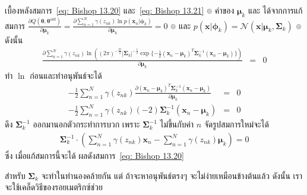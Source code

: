 เบื้องหลังสมการ~\ref{eq: Bishop 13.20} และ~\ref{eq: Bishop 13.21}
๏ ค่าของ $\bm{\mu}_k$ และ ได้จากการแก้สมการ $\frac{\partial Q(\bm{\theta}, \bm{\theta}^{old})}{\partial \bm{\mu}_k} = \frac{\partial \sum_{n=1}^N \gamma (z_{nk}) \ln p(\textbf{x}_n|\bm{\phi}_k)}{\partial \bm{\mu}_k} = 0$ 
๏ และ $p(\textbf{x}|\bm{\phi}_k) = \mathcal{N}(\textbf{x}|\bm{\mu}_k, \bm{\Sigma}_k)$
๏ ดังนั้น
\begin{eqnarray}
\frac{\partial \sum_{n=1}^N \gamma (z_{nk}) \ln \left( (2 \pi)^{-\frac{D}{2}} | \bm{\Sigma}_k |^{-\frac{1}{2}} \exp\{ -\frac{1}{2} (\textbf{x}_n - \bm{\mu}_k)^T \bm{\Sigma}_k^{-1} (\textbf{x}_n - \bm{\mu}_k) \}\right)}{\partial \bm{\mu}_k} &=& 0
\nonumber
\end{eqnarray}
ทำ $\ln$ ก่อนและทำอนุพันธ์จะได้
\begin{eqnarray}
-\frac{1}{2} \sum_{n=1}^N \gamma (z_{nk})  \frac{\partial (\textbf{x}_n - \bm{\mu}_k)^T \bm{\Sigma}_k^{-1} (\textbf{x}_n - \bm{\mu}_k)}{\partial \bm{\mu}_k}
&=& 0
\nonumber \\
-\frac{1}{2} \sum_{n=1}^N \gamma (z_{nk})  (-2) \bm{\Sigma}_k^{-1} (\textbf{x}_n - \bm{\mu}_k)
&=& 0
\nonumber
\end{eqnarray}
ดึง $\bm{\Sigma}_k^{-1}$ ออกมานอกตัวกระทำการบวก เพราะ $\bm{\Sigma}_k^{-1}$ ไม่ขึ้นกับค่า $n$
จัดรูปสมการใหม่จะได้
\begin{eqnarray}
\bm{\Sigma}_k^{-1} \cdot \left(\sum_{n=1}^N \gamma (z_{nk}) \textbf{x}_n - \sum_{n=1}^N \gamma (z_{nk}) \bm{\mu}_k \right) = 0
\nonumber
\end{eqnarray}
ซึ่ง เมื่อแก้สมการนี้จะได้ ผลดังสมการ~\ref{eq: Bishop 13.20}

สำหรับ $\bm{\Sigma}_k$ จะทำในทำนองคล้ายกัน
แต่ ถ้าจะหาอนุพันธ์ตรงๆ 
จะไม่ง่ายเหมือนข้างต้นแล้ว 
ดังนั้น เราจะใช้เคล็ดวิธีของรอยเมตริกซ์ช่วย

%

